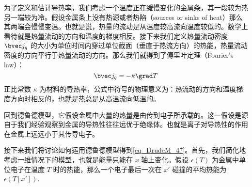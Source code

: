 为了定义和估计导热率，我们考虑一个温度正在缓慢变化的金属条，其一段较为热另一端较为冷。假设金属条上没有热源或者热陷（sources or sinks of heat）那么其两端会慢慢变温。也就是说，热量的流动是从温度较高流向温度较低的。数学上看待就是热量流动的方向和温度的梯度相反。接下来我们定义热量流动密度 $\bvec j_q$ 的大小为单位时间内穿过单位截面（垂直于热流方向）的热能，热量流动密度的方向平行于热量流动的方向。那么我们就得到了傅里叶定理（Fourier's law）：
\begin{equation}
\bvec j_q =-\kappa\grad T
\end{equation}
正比常数 $\kappa$ 为材料的导热率，公式中符号的物理意义为：热流动的方向和温度梯度方向时相反的，也就是热总是从高温流向低温的。

回到德鲁德模型，它假设金属中大量的热量是由传到电子所承载的。这一假设是源自于我们经验观察到金属的导热性往往远优于绝缘体。也就是离子对导热性的作用在金属上远远小于其传导电子。

接下来我们将讨论如何运用德鲁德模型得到\autoref{eq_DrudeM_47}。首先，我们简化地考虑一维情况下的模型，也就是能量只能在 $x$ 轴上变化。假设 $\epsilon(T)$ 为金属中单位电子在温度 $T$ 时的热能，那么一个电子最后一次在 $x'$ 碰撞的平均热能为 $\epsilon(T[x'])$.

